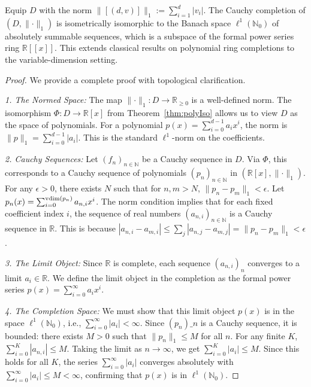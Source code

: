 \begin{theorem}[Completion]\label{thm:completion}
Equip \(D\) with the norm \(\lVert[(d,v)]\rVert_1:=\sum_{i=1}^{d}|v_i|\). The Cauchy completion of \((D, \lVert \cdot \rVert_1)\) is isometrically isomorphic to the Banach space \(\ell^1(\mathbb{N}_0)\) of absolutely summable sequences, which is a subspace of the formal power series ring \(\mathbb R[[x]]\). This extends classical results on polynomial ring completions \cite{Rudin1991,VonZurGathenGerhard2013} to the variable-dimension setting.
\end{theorem}
\begin{proof}
We provide a complete proof with topological clarification.

\textit{1. The Normed Space:}
The map \(\lVert \cdot \rVert_1: D \to \mathbb{R}_{\ge 0}\) is a well-defined norm. The isomorphism \(\Phi: D \to \mathbb{R}[x]\) from Theorem~\ref{thm:polyIso} allows us to view \(D\) as the space of polynomials. For a polynomial \(p(x) = \sum_{i=0}^{d-1} a_i x^i\), the norm is \(\lVert p \rVert_1 = \sum_{i=0}^{d-1} |a_i|\). This is the standard \(\ell^1\)-norm on the coefficients.

\textit{2. Cauchy Sequences:}
Let \((f_n)_{n \in \mathbb{N}}\) be a Cauchy sequence in \(D\). Via \(\Phi\), this corresponds to a Cauchy sequence of polynomials \((p_n)_{n \in \mathbb{N}}\) in \((\mathbb{R}[x], \lVert \cdot \rVert_1)\). For any \(\epsilon > 0\), there exists \(N\) such that for \(n,m > N\), \(\lVert p_n - p_m \rVert_1 < \epsilon\).
Let \(p_n(x) = \sum_{i=0}^{\operatorname{vdim}(p_n)} a_{n,i} x^i\). The norm condition implies that for each fixed coefficient index \(i\), the sequence of real numbers \((a_{n,i})_{n \in \mathbb{N}}\) is a Cauchy sequence in \(\mathbb{R}\). This is because \(|a_{n,i} - a_{m,i}| \le \sum_j |a_{n,j} - a_{m,j}| = \lVert p_n - p_m \rVert_1 < \epsilon\).

\textit{3. The Limit Object:}
Since \(\mathbb{R}\) is complete, each sequence \((a_{n,i})_n\) converges to a limit \(a_i \in \mathbb{R}\). We define the limit object in the completion as the formal power series \(p(x) = \sum_{i=0}^{\infty} a_i x^i\).

\textit{4. The Completion Space:}
We must show that this limit object \(p(x)\) is in the space \(\ell^1(\mathbb{N}_0)\), i.e., \(\sum_{i=0}^{\infty} |a_i| < \infty\).
Since \((p_n)\_n\) is a Cauchy sequence, it is bounded: there exists \(M > 0\) such that \(\lVert p_n \rVert_1 \le M\) for all \(n\). For any finite \(K\), \(\sum_{i=0}^K |a_{n,i}| \le M\). Taking the limit as \(n \to \infty\), we get \(\sum_{i=0}^K |a_i| \le M\). Since this holds for all \(K\), the series \(\sum_{i=0}^{\infty} |a_i|\) converges absolutely with \(\sum_{i=0}^{\infty} |a_i| \le M < \infty\), confirming that \(p(x)\) is in \(\ell^1(\mathbb{N}_0)\).


\end{proof}
